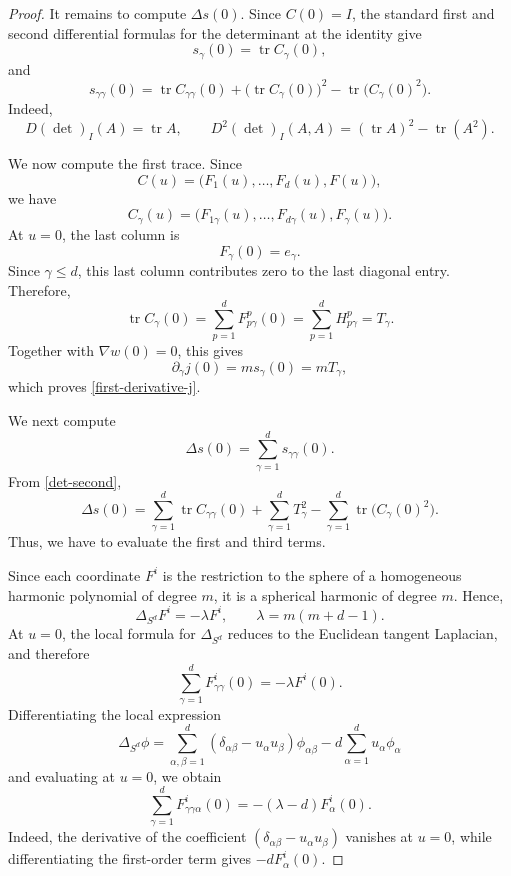 \documentclass[10pt,a4paper]{amsart}
\DeclareMathOperator{\tr}{tr}
\begin{document}
\begin{proof}
It remains to compute \(\Delta s(0)\). Since \(C(0)=I\), the standard first
and second differential formulas for the determinant at the identity give
\[
        s_\gamma(0)=\tr C_\gamma(0),
\]
and
\begin{equation}\label{det-second}
        s_{\gamma\gamma}(0)
        =
        \tr C_{\gamma\gamma}(0)
        +
        \bigl(\tr C_\gamma(0)\bigr)^2
        -
        \tr\bigl(C_\gamma(0)^2\bigr).
\end{equation}
Indeed,
\[
        D(\det)_I(A)=\tr A,
        \qquad
        D^2(\det)_I(A,A)=(\tr A)^2-\tr(A^2).
\]

We now compute the first trace. Since
\[
        C(u)=\bigl(F_1(u),\ldots,F_d(u),F(u)\bigr),
\]
we have
\[
        C_\gamma(u)=\bigl(F_{1\gamma}(u),\ldots,F_{d\gamma}(u),F_\gamma(u)\bigr).
\]
At \(u=0\), the last column is
\[
        F_\gamma(0)=e_\gamma.
\]
Since \(\gamma\le d\), this last column contributes zero to the last diagonal
entry. Therefore,
\begin{equation}\label{trace-Cgamma}
        \tr C_\gamma(0)
        =
        \sum_{p=1}^{d}F^p_{p\gamma}(0)
        =
        \sum_{p=1}^{d}H^p_{p\gamma}
        =
        T_\gamma.
\end{equation}
Together with \(\nabla w(0)=0\), this gives
\[
        \partial_\gamma j(0)=ms_\gamma(0)=mT_\gamma,
\]
which proves \eqref{first-derivative-j}.

We next compute
\[
        \Delta s(0)=\sum_{\gamma=1}^{d}s_{\gamma\gamma}(0).
\]
From \eqref{det-second},
\[
        \Delta s(0)
        =
        \sum_{\gamma=1}^{d}\tr C_{\gamma\gamma}(0)
        +
        \sum_{\gamma=1}^{d}T_\gamma^2
        -
        \sum_{\gamma=1}^{d}\tr\bigl(C_\gamma(0)^2\bigr).
\]
Thus, we have to evaluate the first and third terms.

Since each coordinate \(F^i\) is the restriction to the sphere of a
homogeneous harmonic polynomial of degree \(m\), it is a spherical harmonic
of degree \(m\). Hence,
\[
        \Delta_{S^d}F^i=-\lambda F^i,
        \qquad
        \lambda=m(m+d-1).
\]
At \(u=0\), the local formula for \(\Delta_{S^d}\) reduces to the Euclidean
tangent Laplacian, and therefore
\begin{equation}\label{second-spherical}
        \sum_{\gamma=1}^{d}F^i_{\gamma\gamma}(0)
        =
        -\lambda F^i(0).
\end{equation}
Differentiating the local expression
\[
        \Delta_{S^d}\phi
        =
        \sum_{\alpha,\beta=1}^{d}
        (\delta_{\alpha\beta}-u_\alpha u_\beta)\phi_{\alpha\beta}
        -
        d\sum_{\alpha=1}^{d}u_\alpha\phi_\alpha
\]
and evaluating at \(u=0\), we obtain
\begin{equation}\label{third-spherical}
        \sum_{\gamma=1}^{d}F^i_{\gamma\gamma\alpha}(0)
        =
        -(\lambda-d)F^i_\alpha(0).
\end{equation}
Indeed, the derivative of the coefficient
\((\delta_{\alpha\beta}-u_\alpha u_\beta)\) vanishes at \(u=0\), while
differentiating the first-order term gives \(-dF^i_\alpha(0)\).


\end{proof}
\end{document}
